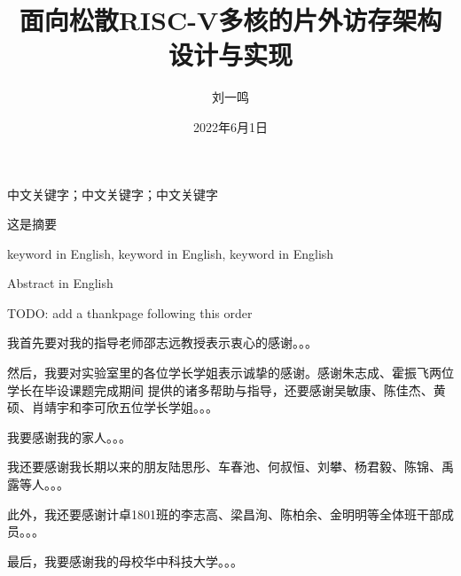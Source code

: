 \documentclass[supercite,notofont]{HustGraduPaper}
\title{面向松散RISC-V多核的片外访存架构设计与实现}
\author{刘一鸣}
\date{2022年6月1日}
\begin{document}


\maketitle

\statement

\clearpage


\begin{cnabstract}{中文关键字；中文关键字；中文关键字}

这是摘要

\end{cnabstract}

\begin{enabstract}{keyword in English, keyword in English, keyword in English}

Abstract in English

\end{enabstract}

\tableofcontents[level=2]

\clearpage






% 
% 
% 

\begin{thankpage}

TODO: add a thankpage following this order

我首先要对我的指导老师邵志远教授表示衷心的感谢。。。

然后，我要对实验室里的各位学长学姐表示诚挚的感谢。感谢朱志成、霍振飞两位学长在毕设课题完成期间
提供的诸多帮助与指导，还要感谢吴敏康、陈佳杰、黄硕、肖靖宇和李可欣五位学长学姐。。。

我要感谢我的家人。。。

我还要感谢我长期以来的朋友陆思彤、车春池、何叔恒、刘攀、杨君毅、陈锦、禹露等人。。。

此外，我还要感谢计卓1801班的李志高、梁昌洵、陈柏余、金明明等全体班干部成员。。。

最后，我要感谢我的母校华中科技大学。。。


\end{thankpage}


\end{document}
